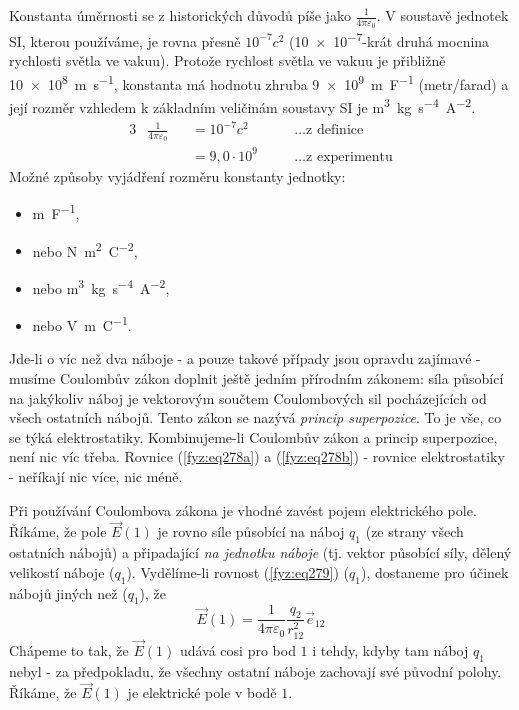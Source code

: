     Konstanta úměrnosti se z historických důvodů píše jako \(\frac{1}{4\pi\varepsilon_0}\). V 
    soustavě jednotek SI, kterou používáme, je rovna přesně \(10^{-7}c^2\) (\num{10e-7}-krát druhá 
    mocnina rychlosti světla ve vakuu). Protože rychlost světla ve vakuu je přibližně 
    \qty{10e8}{\meter\per\second}, konstanta má hodnotu zhruba \qty{9e9}{\meter\per\farad} 
    (metr/farad) a její rozměr vzhledem k základním veličinám soustavy SI je 
    \unit{\cubic\meter\kilogram\second^{-4}\ampere^{-2}}.
    \begin{alignat*}{3}
     &\frac{1}{4\pi\varepsilon_0} &&= 10^{-7}c^2   \quad && \ldots \text{z definice}     \\
     &                            &&= 9,0\cdot10^9 \quad && \ldots \text{z experimentu} 
    \end{alignat*}
    Možné způsoby vyjádření rozměru konstanty jednotky: 
    \begin{itemize}
     \setlength{\itemsep}{0cm}%
     \setlength{\parskip}{0em}%
       \item \unit{\meter\per\farad},    
       \item nebo \unit{\newton\square\meter\per\square\coulomb},    
       \item nebo \unit{\cubic\meter\kilogram\second^{-4}\ampere^{-2}},
       \item nebo \unit{\volt\meter\per\coulomb}.
    \end{itemize}
    
    Jde-li o víc než dva náboje - a pouze takové případy jsou opravdu zajímavé - musíme Coulombův 
    zákon doplnit ještě jedním přírodním zákonem: síla působící na jakýkoliv náboj je vektorovým 
    součtem Coulombových sil pocházejících od všech ostatních nábojů. Tento zákon se nazývá 
    \emph{princip superpozice}. To je vše, co se týká elektrostatiky. Kombinujeme-li Coulombův 
    zákon a princip superpozice, není nic víc třeba. Rovnice (\ref{fyz:eq278a}) a 
    (\ref{fyz:eq278b}) - rovnice elektrostatiky - neříkají nic více, nic méně.
     
    Při používání Coulombova zákona je vhodné zavést pojem elektrického pole. Říkáme, že pole 
    \(\vec{E}(1)\) je rovno síle působící na náboj \(q_1\) (ze strany všech ostatních nábojů) a 
    připadající \emph{na jednotku náboje} (tj. vektor působící síly, dělený velikostí náboje 
    (\(q_1\)). Vydělíme-li rovnost (\ref{fyz:eq279}) (\(q_1\)), dostaneme pro účinek 
    nábojů jiných než (\(q_1\)), že
    \begin{equation}\label{fyz:eq280}
     \vec{E}(1) = \frac{1}{4\pi\varepsilon_0}\frac{q_2}{r^2_{12}}\vec{e}_{12}
    \end{equation}
    Chápeme to tak, že \(\vec{E}(1)\) udává cosi pro bod \(1\) i tehdy, kdyby tam náboj \(q_1\) 
    nebyl -  za předpokladu, že všechny ostatní náboje zachovají své původní polohy. Říkáme, že 
    \(\vec{E}(1)\) je elektrické pole v bodě \(1\).
     
